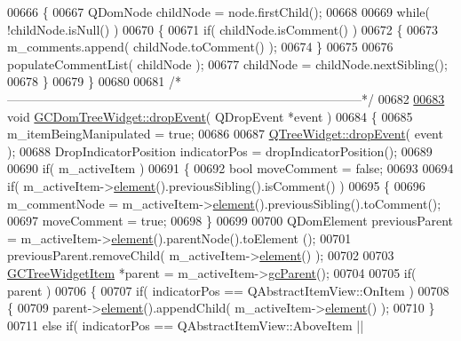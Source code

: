 \begin{DoxyCode}
00666 \{
00667   QDomNode childNode = node.firstChild();
00668 
00669   \textcolor{keywordflow}{while}( !childNode.isNull() )
00670   \{
00671     \textcolor{keywordflow}{if}( childNode.isComment() )
00672     \{
00673       m\_comments.append( childNode.toComment() );
00674     \}
00675 
00676     populateCommentList( childNode );
00677     childNode = childNode.nextSibling();
00678   \}
00679 \}
00680 
00681 \textcolor{comment}{/*
      --------------------------------------------------------------------------------------*/}
00682 
\hypertarget{gcdomtreewidget_8cpp_source_l00683}{}\hyperlink{class_g_c_dom_tree_widget_ac4ccf569a0c538e3c1c72e887f78f5b6}{00683} \textcolor{keywordtype}{void} \hyperlink{class_g_c_dom_tree_widget_ac4ccf569a0c538e3c1c72e887f78f5b6}{GCDomTreeWidget::dropEvent}( QDropEvent *event )
00684 \{
00685   m\_itemBeingManipulated = \textcolor{keyword}{true};
00686 
00687   \hyperlink{class_g_c_dom_tree_widget_ac4ccf569a0c538e3c1c72e887f78f5b6}{QTreeWidget::dropEvent}( event );
00688   DropIndicatorPosition indicatorPos = dropIndicatorPosition();
00689 
00690   \textcolor{keywordflow}{if}( m\_activeItem )
00691   \{
00692     \textcolor{keywordtype}{bool} moveComment = \textcolor{keyword}{false};
00693 
00694     \textcolor{keywordflow}{if}( m\_activeItem->\hyperlink{class_g_c_tree_widget_item_a584cad866bdbd94710d31eb77b804d84}{element}().previousSibling().isComment() )
00695     \{
00696       m\_commentNode = m\_activeItem->\hyperlink{class_g_c_tree_widget_item_a584cad866bdbd94710d31eb77b804d84}{element}().previousSibling().toComment();
00697       moveComment = \textcolor{keyword}{true};
00698     \}
00699 
00700     QDomElement previousParent = m\_activeItem->\hyperlink{class_g_c_tree_widget_item_a584cad866bdbd94710d31eb77b804d84}{element}().parentNode().toElement
      ();
00701     previousParent.removeChild( m\_activeItem->\hyperlink{class_g_c_tree_widget_item_a584cad866bdbd94710d31eb77b804d84}{element}() );
00702 
00703     \hyperlink{class_g_c_tree_widget_item}{GCTreeWidgetItem} *parent = m\_activeItem->\hyperlink{class_g_c_tree_widget_item_a1125dbc55a8ba3e50662b8258cb35fdf}{gcParent}();
00704 
00705     \textcolor{keywordflow}{if}( parent )
00706     \{
00707       \textcolor{keywordflow}{if}( indicatorPos == QAbstractItemView::OnItem )
00708       \{
00709         parent->\hyperlink{class_g_c_tree_widget_item_a584cad866bdbd94710d31eb77b804d84}{element}().appendChild( m\_activeItem->\hyperlink{class_g_c_tree_widget_item_a584cad866bdbd94710d31eb77b804d84}{element}() );
00710       \}
00711       \textcolor{keywordflow}{else} \textcolor{keywordflow}{if}( indicatorPos == QAbstractItemView::AboveItem ||

\end{DoxyCode}

